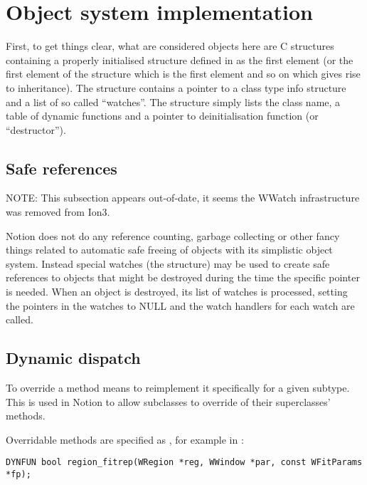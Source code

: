 \section{Object system implementation}

First, to get things clear, what are considered objects here are C
structures containing a properly initialised \type{}
structure defined in  as the first element (or the
first element of the structure which is the first element and so on which
gives rise to inheritance). The  structure contains a pointer
to a  class type info structure and
a list of so called ``watches''. The  structure simply
lists the class name, a table of dynamic functions and a pointer to
deinitialisation function (or ``destructor'').

\subsection{Safe references}

NOTE: This subsection appears out-of-date, it seems the WWatch infrastructure
was removed from Ion3.

Notion does not do any reference counting, garbage collecting or other
fancy things related to automatic safe freeing of objects with its
simplistic object system. Instead special watches (the 
 structure) may be used to create safe references to
objects that might be destroyed during the time the specific pointer is
needed. When an object is destroyed, its list of watches is processed,
setting the pointers in the watches to NULL and the watch handlers for
each watch are called. 

\subsection{Dynamic dispatch}

To override a method means to reimplement it specifically for a given subtype.
This is used in Notion to allow subclasses to override of their superclasses' 
methods.

Overridable methods are specified as , for example 
 in :

\begin{verbatim}
DYNFUN bool region_fitrep(WRegion *reg, WWindow *par, const WFitParams *fp);
\end{verbatim}

